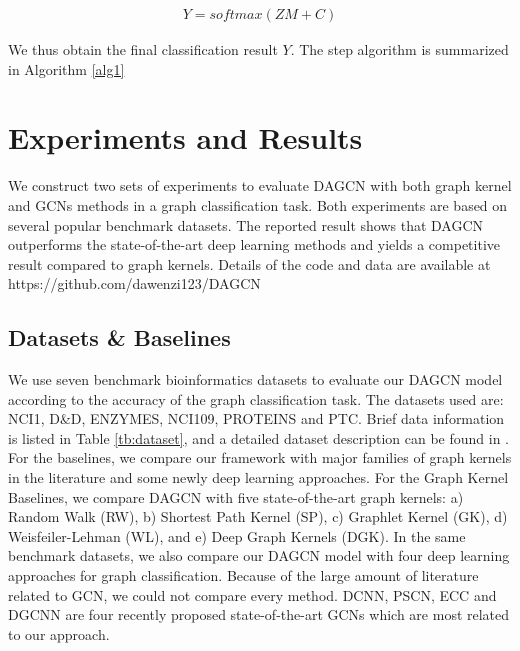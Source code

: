 \documentclass[conference]{IEEEtran}
\begin{document}
		\begin{eqnarray}
			Y = softmax(ZM + C)
			\label{eq:eq5}
		\end{eqnarray}
		
		We thus obtain the final classification result $Y$. The step algorithm is summarized in Algorithm \ref{alg1}
		
	\section{Experiments and Results} We construct two sets of experiments to evaluate DAGCN with both graph kernel and GCNs methods in a graph classification task. Both experiments are based on several popular benchmark datasets. The reported result shows that DAGCN outperforms the state-of-the-art deep learning methods and yields a competitive result compared to graph kernels. Details of the code and data are available at https://github.com/dawenzi123/DAGCN

    \subsection{Datasets \& Baselines}We use seven benchmark bioinformatics datasets to evaluate our DAGCN model according to the accuracy of the graph classification task. The datasets used are: NCI1, D\&D, ENZYMES, NCI109, PROTEINS and PTC. Brief data information is listed in Table \ref{tb:dataset}, and a detailed dataset description can be found in \cite{yanardag2015deep}. For the baselines, we compare our framework with major families of graph kernels in the literature and some newly deep learning approaches. For the Graph Kernel Baselines, we compare DAGCN with five state-of-the-art graph kernels: a) Random Walk (RW)\cite{gartner2003graph}, b) Shortest Path Kernel (SP)\cite{borgwardt2005shortest}, c) Graphlet Kernel (GK)\cite{kondor2009graphlet}, d) Weisfeiler-Lehman (WL)\cite{shervashidze2011weisfeiler}, and e) Deep Graph Kernels (DGK)\cite{yanardag2015deep}. In the same benchmark datasets, we also compare our DAGCN model with four deep learning approaches for graph classification. Because of the large amount of literature related to GCN, we could not compare every method. DCNN, PSCN, ECC and DGCNN are four recently proposed state-of-the-art GCNs which are most related to our approach. 

    \begin{table}[ht]
    \caption{}
    \centering
    \label{tb:dataset}
    \end{table}
    
\end{document}
